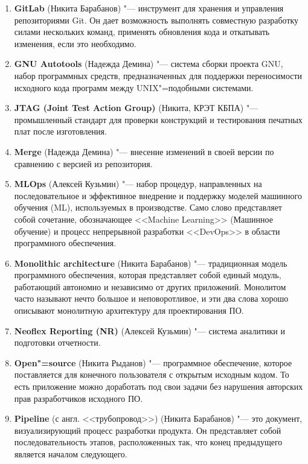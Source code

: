 \documentclass[12pt]{article}
\begin{document}
\begin{enumerate}
    \item \textbf{GitLab} (Никита Барабанов) "--- инструмент для хранения и управления репозиториями Git. Он дает возможность выполнять совместную разработку силами нескольких команд, применять обновления кода и откатывать изменения, если это необходимо.

    \item \textbf{GNU Autotools} (Надежда Демина) "--- система сборки проекта GNU, набор программных средств, предназначенных для поддержки переносимости исходного кода программ между UNIX"=подобными системами.

    \item \textbf{JTAG (Joint Test Action Group)} (Никита, КРЭТ КБПА) "--- промышленный стандарт для проверки конструкций и тестирования печатных плат после изготовления.
    
    \item \textbf{Merge} (Надежда Демина) "--- внесение изменений в своей версии по сравнению с версией из репозитория.

    \item \textbf{MLOps} (Алексей Кузьмин) "--- набор процедур, направленных на последовательное и эффективное внедрение и поддержку моделей машинного обучения (ML), используемых в производстве. Само слово представляет собой сочетание, обозначающее <<Machine Learning>> (Машинное обучение) и процесс непрерывной разработки <<DevOps>> в области программного обеспечения.

    \item \textbf{Monolithic architecture} (Никита Барабанов) "--- традиционная модель программного обеспечения, которая представляет собой единый модуль, работающий автономно и независимо от других приложений. Монолитом часто называют нечто большое и неповоротливое, и эти два слова хорошо описывают монолитную архитектуру для проектирования ПО. 

    \item \textbf{Neoflex Reporting (NR)} (Алексей Кузьмин) "--- система аналитики и подготовки отчетности.

    \item \textbf{Open"=source} (Никита Рыданов) "--- программное обеспечение, которое поставляется для конечного пользователя с открытым исходным кодом. То есть приложение можно доработать под свои задачи без нарушения авторских прав разработчиков исходного ПО. 

    \item \textbf{Pipeline} (с англ. <<трубопровод>>) (Никита Барабанов) "--- это документ, визуализирующий процесс разработки продукта. Он представляет собой последовательность этапов, расположенных так, что конец предыдущего является началом следующего.


\end{enumerate}
\end{document}
